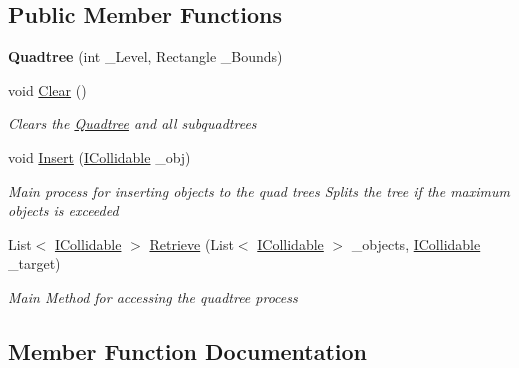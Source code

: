 \subsection*{Public Member Functions}
\begin{DoxyCompactItemize}
\item 
\mbox{\label{class_g_m_t_b_1_1_collision_system_1_1_quadtree_a1be54f5c6efca9f9ed78206849472c8c}} 
{\bfseries Quadtree} (int \+\_\+\+Level, Rectangle \+\_\+\+Bounds)
\item 
void \mbox{\hyperlink{class_g_m_t_b_1_1_collision_system_1_1_quadtree_a7bfe7e80821c425da16ba1bcabfac9ac}{Clear}} ()
\begin{DoxyCompactList}\small\item\em Clears the \mbox{\hyperlink{class_g_m_t_b_1_1_collision_system_1_1_quadtree}{Quadtree}} and all subquadtrees \end{DoxyCompactList}\item 
void \mbox{\hyperlink{class_g_m_t_b_1_1_collision_system_1_1_quadtree_a31faf1269f7048a71c59db80f8e6c375}{Insert}} (\mbox{\hyperlink{interface_g_m_t_b_1_1_collision_system_1_1_i_collidable}{I\+Collidable}} \+\_\+obj)
\begin{DoxyCompactList}\small\item\em Main process for inserting objects to the quad trees Splits the tree if the maximum objects is exceeded \end{DoxyCompactList}\item 
List$<$ \mbox{\hyperlink{interface_g_m_t_b_1_1_collision_system_1_1_i_collidable}{I\+Collidable}} $>$ \mbox{\hyperlink{class_g_m_t_b_1_1_collision_system_1_1_quadtree_aefeacbfba0320ea7e23c15658179c2c6}{Retrieve}} (List$<$ \mbox{\hyperlink{interface_g_m_t_b_1_1_collision_system_1_1_i_collidable}{I\+Collidable}} $>$ \+\_\+objects, \mbox{\hyperlink{interface_g_m_t_b_1_1_collision_system_1_1_i_collidable}{I\+Collidable}} \+\_\+target)
\begin{DoxyCompactList}\small\item\em Main Method for accessing the quadtree process \end{DoxyCompactList}\end{DoxyCompactItemize}


\subsection{Member Function Documentation}
\mbox{\label{class_g_m_t_b_1_1_collision_system_1_1_quadtree_a7bfe7e80821c425da16ba1bcabfac9ac}} 
